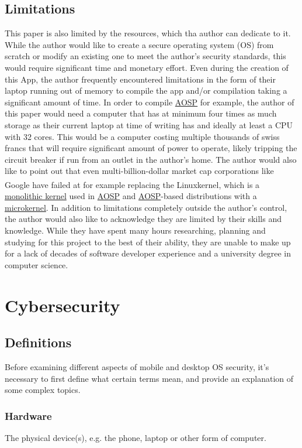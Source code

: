 \documentclass[a4paper,12pt]{report}
\begin{document}
\subsection{Limitations}
This paper is also limited by the resources, which tha author can dedicate to it. While the author would like to create a secure operating system (OS) from scratch or modify an existing one to meet the author's security standards, this would require significant time and monetary effort. Even during the creation of this App, the author frequently encountered limitations in the form of their laptop running out of memory to compile the app and/or compilation taking a significant amount of time. 
In order to compile \hyperref[aosp]{AOSP} for example, the author of this paper would need a computer that has at minimum four times as much storage as their current laptop at time of writing has and ideally at least a CPU with 32 cores. This would be a computer costing multiple thousands of swiss francs that will require significant amount of power to operate, likely tripping the circuit breaker if run from an outlet in the author's home. 
The author would also like to point out that even multi-billion-dollar market cap corporations like Google have failed at for example replacing the Linux\textsuperscript{\citep{linux}}kernel, which is a \hyperref[monokernel]{monolithic kernel} used in \hyperref[aosp]{AOSP} and \hyperref[aosp]{AOSP}-based distributions with a \hyperref[microkernel]{microkernel}.
In addition to limitations completely outside the author's control, the author would also like to acknowledge they are limited by their skills and knowledge. While they have spent many hours researching, planning and studying for this project to the best of their ability, they are unable to make up for a lack of decades of software developer experience and a university degree in computer science. 

\section{Cybersecurity}
\subsection{Definitions}
Before examining different aspects of mobile and desktop OS security, it's necessary to first define what certain terms mean, and provide an explanation of some complex topics.
\subsubsection{Hardware}
The physical device(s), e.g. the phone, laptop or other form of computer.
\end{document}
